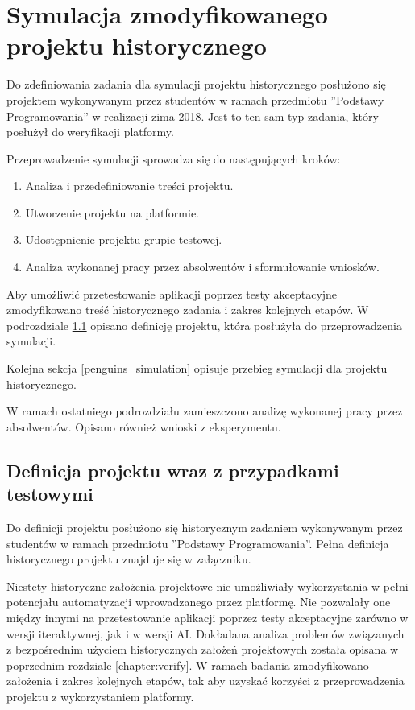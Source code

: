 \section{Symulacja zmodyfikowanego projektu historycznego}
\label{research_penguins}

Do zdefiniowania zadania dla symulacji projektu historycznego posłużono się projektem wykonywanym przez studentów w ramach przedmiotu ”Podstawy Programowania” w realizacji zima 2018.
Jest to ten sam typ zadania, który posłużył do weryfikacji platformy.

Przeprowadzenie symulacji sprowadza się do następujących kroków:
\begin{enumerate}
    \item Analiza i przedefiniowanie treści projektu.
    \item Utworzenie projektu na platformie.
    \item Udostępnienie projektu grupie testowej.
    \item Analiza wykonanej pracy przez absolwentów i sformułowanie wniosków.
\end{enumerate}

Aby umożliwić przetestowanie aplikacji poprzez testy akceptacyjne zmodyfikowano treść historycznego zadania i zakres kolejnych etapów.
W podrozdziale \ref{penguins_project_definition} opisano definicję projektu, która posłużyła do przeprowadzenia symulacji.

Kolejna sekcja \ref{penguins_simulation} opisuje przebieg symulacji dla projektu historycznego.

W ramach ostatniego podrozdziału zamieszczono analizę wykonanej pracy przez absolwentów.
Opisano również wnioski z eksperymentu.


\subsection{Definicja projektu wraz z przypadkami testowymi}
\label{penguins_project_definition}

Do definicji projektu posłużono się historycznym zadaniem wykonywanym przez studentów w ramach przedmiotu ”Podstawy Programowania”.
Pełna definicja historycznego projektu znajduje się w załączniku.

Niestety historyczne założenia projektowe nie umożliwiały wykorzystania w pełni potencjału automatyzacji wprowadzanego przez platformę.
Nie pozwalały one między innymi na przetestowanie aplikacji poprzez testy akceptacyjne zarówno w wersji iteraktywnej, jak i w wersji AI.
Dokładana analiza problemów związanych z bezpośrednim użyciem historycznych założeń projektowych została opisana w poprzednim rozdziale \ref{chapter:verify}.
W ramach badania zmodyfikowano założenia i zakres kolejnych etapów, tak aby uzyskać korzyści z przeprowadzenia projektu z wykorzystaniem platformy.

